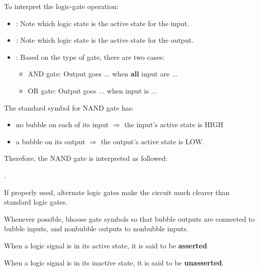       \par To interpret the logic-gate operation:
      \begin{itemize}
        \item {}: Note which logic state is the active state for the input.
        \item {}: Note which logic state is the active state for the output.
        \item {}: Based on the type of gate, there are two cases:
          \begin{itemize}
            \item AND gate: Output goes ... when \textbf{all} input are ...
            \item OR gate: Output goes ... when  input is ...
          \end{itemize}
      \end{itemize}

    \par The standard symbol for NAND gate has:
    \begin{itemize}
      \item no bubble on each of its input $\Rightarrow$ the input's active
      state is HIGH
      \item a bubble on its output $\Rightarrow$ the output's active state
      is LOW.
    \end{itemize}
    \par Therefore, the NAND gate is interpreted as followed:
    \par {}.
  \hiiEND


    \par If properly used, alternate logic gates make the circuit much clearer
    than standard logic gates.
    \par Whenever possible, bhoose gate symbols so that bubble outputs are
    connected to bubble inputs, and nonbubble outputs to nonbubble inputs.
    \par When a logic signal is in its active state, it is said to be
    \textbf{asserted}.
    \par When a logic signal is in its inactive state, it is said to be
    \textbf{unasserted}.
